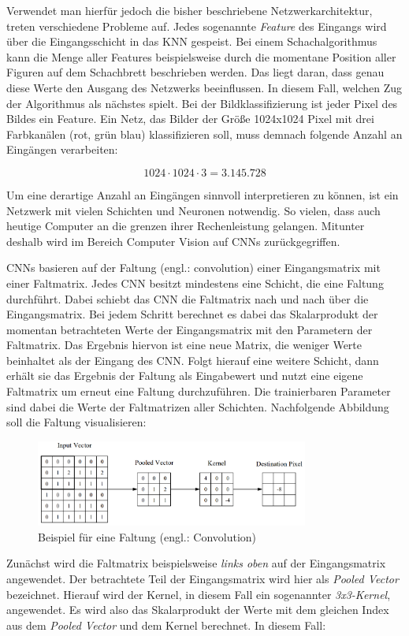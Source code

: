 Verwendet man hierfür jedoch die bisher beschriebene Netzwerkarchitektur, treten verschiedene Probleme auf. Jedes sogenannte \emph{Feature} des Eingangs wird über die Eingangsschicht in das \ac{KNN} gespeist. Bei einem Schachalgorithmus kann die Menge aller Features beispielsweise durch die momentane Position aller Figuren auf dem Schachbrett beschrieben werden. Das liegt daran, dass genau diese Werte den Ausgang des Netzwerks beeinflussen. In diesem Fall, welchen Zug der Algorithmus als nächstes spielt. Bei der Bildklassifizierung ist jeder Pixel des Bildes ein Feature. Ein Netz, das Bilder der Größe 1024x1024 Pixel mit drei Farbkanälen (rot, grün blau) klassifizieren soll, muss demnach folgende Anzahl an Eingängen verarbeiten:

\begin{equation}
   1024 \cdot 1024 \cdot 3 = 3.145.728
\end{equation}

Um eine derartige Anzahl an Eingängen sinnvoll interpretieren zu können, ist ein Netzwerk mit vielen Schichten und Neuronen notwendig. So vielen, dass auch heutige Computer an die grenzen ihrer Rechenleistung gelangen. Mitunter deshalb wird im Bereich Computer Vision auf \acp{CNN} zurückgegriffen. 

\acp{CNN} basieren auf der Faltung (engl.: convolution) einer Eingangsmatrix mit einer Faltmatrix. Jedes \ac{CNN} besitzt mindestens eine Schicht, die eine Faltung durchführt. Dabei schiebt das \ac{CNN} die Faltmatrix nach und nach über die Eingangsmatrix. Bei jedem Schritt berechnet es dabei das Skalarprodukt der momentan betrachteten Werte der Eingangsmatrix mit den Parametern der Faltmatrix. Das Ergebnis hiervon ist eine neue Matrix, die weniger Werte beinhaltet als der Eingang des \ac{CNN}. Folgt hierauf eine weitere Schicht, dann erhält sie das Ergebnis der Faltung als Eingabewert und nutzt eine eigene Faltmatrix um erneut eine Faltung durchzuführen. Die trainierbaren Parameter sind dabei die Werte der Faltmatrizen aller Schichten. Nachfolgende Abbildung soll die Faltung visualisieren:

\begin{figure}[H]
      \centering
      \includegraphics[width=0.8\textwidth]{images/KNNs/CNN Convolution.png}
      \caption{Beispiel für eine Faltung (engl.: Convolution) \cite{cnnsIntroduction}}
      \label{fig:convolution}
\end{figure}

Zunächst wird die Faltmatrix beispielsweise \emph{links oben} auf der Eingangsmatrix angewendet. Der betrachtete Teil der Eingangsmatrix wird hier als \emph{Pooled Vector} bezeichnet. Hierauf wird der Kernel, in diesem Fall ein sogenannter \emph{3x3-Kernel}, angewendet. Es wird also das Skalarprodukt der Werte mit dem gleichen Index aus dem \emph{Pooled Vector} und dem Kernel berechnet. In diesem Fall:
